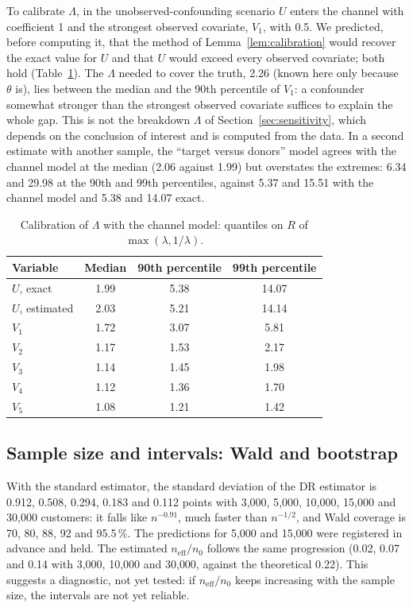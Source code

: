 \documentclass[twoside,11pt]{article}
\newcommand{\neff}{n_{\mathrm{eff}}}
\theoremstyle{plain}
\theoremstyle{definition}
\begin{document}
To calibrate $\Lambda$, in the unobserved-confounding scenario $U$ enters the channel with coefficient 1 and the strongest observed covariate, $V_1$, with 0.5. We predicted, before computing it, that the method of Lemma~\ref{lem:calibration} would recover the exact value for $U$ and that $U$ would exceed every observed covariate; both hold (Table~\ref{tab:calibration}). The $\Lambda$ needed to cover the truth, 2.26 (known here only because $\theta$ is), lies between the median and the 90th percentile of $V_1$: a confounder somewhat stronger than the strongest observed covariate suffices to explain the whole gap. This is not the breakdown $\Lambda$ of Section~\ref{sec:sensitivity}, which depends on the conclusion of interest and is computed from the data. In a second estimate with another sample, the ``target versus donors'' model agrees with the channel model at the median (2.06 against 1.99) but overstates the extremes: 6.34 and 29.98 at the 90th and 99th percentiles, against 5.37 and 15.51 with the channel model and 5.38 and 14.07 exact.

\begin{table}[ht]
\centering\small
\caption{Calibration of $\Lambda$ with the channel model: quantiles on $R$ of $\max(\lambda,1/\lambda)$.}\label{tab:calibration}
\begin{tabular}{@{}lccc@{}}
\toprule
Variable & Median & 90th percentile & 99th percentile \\
\midrule
$U$, exact & 1.99 & 5.38 & 14.07 \\
$U$, estimated & 2.03 & 5.21 & 14.14 \\
$V_1$ & 1.72 & 3.07 & 5.81 \\
$V_2$ & 1.17 & 1.53 & 2.17 \\
$V_3$ & 1.14 & 1.45 & 1.98 \\
$V_4$ & 1.12 & 1.36 & 1.70 \\
$V_5$ & 1.08 & 1.21 & 1.42 \\
\bottomrule
\end{tabular}
\end{table}

\subsection{Sample size and intervals: Wald and bootstrap}\label{sec:res-bootstrap}

With the standard estimator, the standard deviation of the DR estimator is 0.912, 0.508, 0.294, 0.183 and 0.112 points with 3{,}000, 5{,}000, 10{,}000, 15{,}000 and 30{,}000 customers: it falls like $n^{-0.91}$, much faster than $n^{-1/2}$, and Wald coverage is 70, 80, 88, 92 and 95.5\,\%. The predictions for 5{,}000 and 15{,}000 were registered in advance and held. The estimated $\neff/n_0$ follows the same progression (0.02, 0.07 and 0.14 with 3{,}000, 10{,}000 and 30{,}000, against the theoretical 0.22). This suggests a diagnostic, not yet tested: if $\neff/n_0$ keeps increasing with the sample size, the intervals are not yet reliable.
\end{document}
